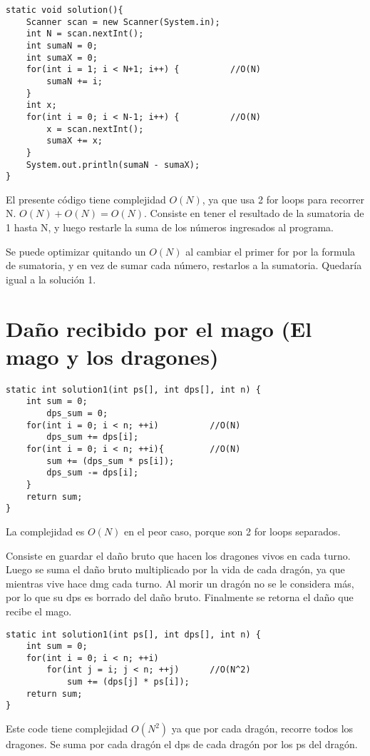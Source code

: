 \documentclass[a4paper,11pt]{article}
\theoremstyle{mytheor}
\begin{document}
\begin{lstlisting}[label={list:fourth},caption=Solución Tarea Diagnóstico.]
static void solution(){
	Scanner scan = new Scanner(System.in);
	int N = scan.nextInt();	
	int sumaN = 0;
	int sumaX = 0;
	for(int i = 1; i < N+1; i++) {			//O(N)
		sumaN += i;
	}
	int x;
	for(int i = 0; i < N-1; i++) {			//O(N)
		x = scan.nextInt();
		sumaX += x;
	}
	System.out.println(sumaN - sumaX);
}
\end{lstlisting}
El presente código tiene complejidad $O(N)$, ya que usa 2 for loops para recorrer N. 
$O(N) + O(N) = O(N)$. 
Consiste en tener el resultado de la sumatoria de 1 hasta N, y luego restarle la suma de los números ingresados al programa.

Se puede optimizar quitando un $O(N)$ al cambiar el primer for por la formula de sumatoria, y en vez de sumar cada número, restarlos a la sumatoria. Quedaría igual a la solución 1.

\pagebreak

\section*{Daño recibido por el mago (El mago y los dragones)}

\begin{lstlisting}[label={list:first},caption=Solución 1 y Diagnóstico.]
static int solution1(int ps[], int dps[], int n) {
	int sum = 0;
		dps_sum = 0;
	for(int i = 0; i < n; ++i) 			//O(N)
		dps_sum += dps[i];
	for(int i = 0; i < n; ++i){			//O(N)
		sum += (dps_sum * ps[i]);
		dps_sum -= dps[i];
	}
	return sum;
}
\end{lstlisting}

 La complejidad es $O(N)$ en el peor caso, porque son 2 for loops separados.
 
 Consiste en guardar el daño bruto que hacen los dragones vivos en cada turno. Luego se suma el daño bruto multiplicado por la vida de cada dragón, ya que mientras vive hace dmg cada turno. Al morir un dragón no se le considera más, por lo que su dps es borrado del daño bruto. Finalmente se retorna el daño que recibe el mago.




\begin{lstlisting}[label={list:second},caption=Solución 2.]
static int solution1(int ps[], int dps[], int n) {
	int sum = 0;
	for(int i = 0; i < n; ++i)				
		for(int j = i; j < n; ++j)		//O(N^2)
			sum += (dps[j] * ps[i]);
	return sum;
}
\end{lstlisting}
Este code tiene complejidad $O(N^{2})$ ya que por cada dragón, recorre todos los dragones. Se suma por cada dragón el dps de cada dragón por los ps del dragón.
\end{document}
